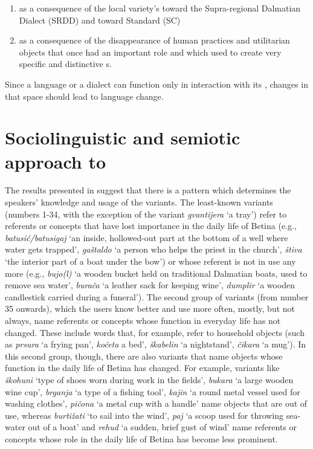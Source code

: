 \documentclass[output=paper]{LSP/langsci}
\begin{document}
\begin{enumerate}
\item as a consequence of the local variety’s  toward the Supra-regional Dalmatian Dialect (SRDD) and toward Standard  (SC)
\item as a consequence of the disappearance of human practices and utilitarian objects that once had an important role and which used to create very specific and distinctive s. 
\end{enumerate}

Since a language or a dialect can function only in interaction with its , changes in that space should lead to language change. 

\section{Sociolinguistic and semiotic approach to }
The results presented in  suggest that there is a pattern which determines the speakers’ knowledge and usage of the variants. The least-known variants (numbers 1-34, with the exception of the variant \textit{gvantijera} ‘a tray’) refer to referents or concepts that have lost importance in the daily life of Betina (e.g., \textit{batusić/batusigaj} `an inside, hollowed-out part at the bottom of a well where water gets trapped', \textit{gaštaldo} `a person who helps the priest in the church', \textit{štiva} ‘the interior part of a boat under the bow') or whose referent is not in use any more (e.g., \textit{bujo(l)} ‘a wooden bucket held on traditional Dalmatian boats, used to remove sea water’, \textit{burača} ‘a leather sack for keeping wine’, \textit{dumplir} ‘a wooden candlestick carried during a funeral’). 
The second group of variants (from number 35 onwards), which the users know better and use more often, mostly, but not always, name referents or concepts whose function in everyday life has not changed. These include words that, for example, refer to household objects (such as \textit{prsura} ‘a frying pan’, \textit{kočeta} a bed’, \textit{škabelin} ‘a nightstand’, \textit{čikara} ‘a mug’). In this second group, though, there are also variants that name objects whose function in the daily life of Betina has changed. For example, variants like \textit{škohuni} ‘type of shoes worn during work in the fields’, \textit{bukara} ‘a large wooden wine cup’, \textit{brganja} ‘a type of a fishing tool’, \textit{kajin} ‘a round metal vessel used for washing clothes’, \textit{pičona} ‘a metal cup with a handle’ name objects that are out of use, whereas \textit{burtižati} ‘to sail into the wind’, \textit{paj} ‘a scoop used for throwing sea-water out of a boat’ and \textit{rehud} ‘a sudden, brief gust of wind’ name referents or concepts whose role in the daily life of Betina has become less prominent. 
\end{document}
